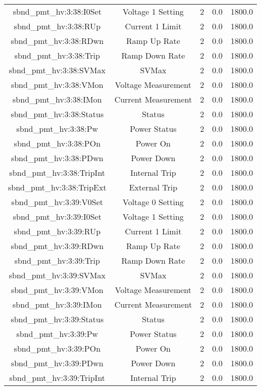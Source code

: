 \begin{center}
\begin{longtable}{c | c c c c }
sbnd\_pmt\_hv:3:38:I0Set & Voltage 1 Setting & 2 & 0.0 & 1800.0\\ 
sbnd\_pmt\_hv:3:38:RUp & Current 1 Limit & 2 & 0.0 & 1800.0\\ 
sbnd\_pmt\_hv:3:38:RDwn & Ramp Up Rate & 2 & 0.0 & 1800.0\\ 
sbnd\_pmt\_hv:3:38:Trip & Ramp Down Rate & 2 & 0.0 & 1800.0\\ 
sbnd\_pmt\_hv:3:38:SVMax & SVMax & 2 & 0.0 & 1800.0\\ 
sbnd\_pmt\_hv:3:38:VMon & Voltage Measurement & 2 & 0.0 & 1800.0\\ 
sbnd\_pmt\_hv:3:38:IMon & Current Measurement & 2 & 0.0 & 1800.0\\ 
sbnd\_pmt\_hv:3:38:Status & Status & 2 & 0.0 & 1800.0\\ 
sbnd\_pmt\_hv:3:38:Pw & Power Status & 2 & 0.0 & 1800.0\\ 
sbnd\_pmt\_hv:3:38:POn & Power On & 2 & 0.0 & 1800.0\\ 
sbnd\_pmt\_hv:3:38:PDwn & Power Down & 2 & 0.0 & 1800.0\\ 
sbnd\_pmt\_hv:3:38:TripInt & Internal Trip & 2 & 0.0 & 1800.0\\ 
sbnd\_pmt\_hv:3:38:TripExt & External Trip & 2 & 0.0 & 1800.0\\ 
sbnd\_pmt\_hv:3:39:V0Set & Voltage 0 Setting & 2 & 0.0 & 1800.0\\ 
sbnd\_pmt\_hv:3:39:I0Set & Voltage 1 Setting & 2 & 0.0 & 1800.0\\ 
sbnd\_pmt\_hv:3:39:RUp & Current 1 Limit & 2 & 0.0 & 1800.0\\ 
sbnd\_pmt\_hv:3:39:RDwn & Ramp Up Rate & 2 & 0.0 & 1800.0\\ 
sbnd\_pmt\_hv:3:39:Trip & Ramp Down Rate & 2 & 0.0 & 1800.0\\ 
sbnd\_pmt\_hv:3:39:SVMax & SVMax & 2 & 0.0 & 1800.0\\ 
sbnd\_pmt\_hv:3:39:VMon & Voltage Measurement & 2 & 0.0 & 1800.0\\ 
sbnd\_pmt\_hv:3:39:IMon & Current Measurement & 2 & 0.0 & 1800.0\\ 
sbnd\_pmt\_hv:3:39:Status & Status & 2 & 0.0 & 1800.0\\ 
sbnd\_pmt\_hv:3:39:Pw & Power Status & 2 & 0.0 & 1800.0\\ 
sbnd\_pmt\_hv:3:39:POn & Power On & 2 & 0.0 & 1800.0\\ 
sbnd\_pmt\_hv:3:39:PDwn & Power Down & 2 & 0.0 & 1800.0\\ 
sbnd\_pmt\_hv:3:39:TripInt & Internal Trip & 2 & 0.0 & 1800.0\\ 

\end{longtable}
\end{center}
